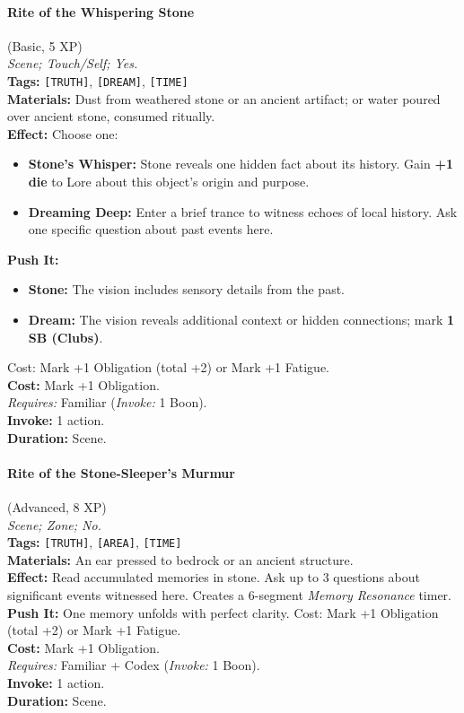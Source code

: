 \paragraph{Rite of the Whispering Stone} (Basic, 5 XP) \hfill \\
\emph{Scene; Touch/Self; Yes.} \\
\textbf{Tags:} \texttt{[TRUTH]}, \texttt{[DREAM]}, \texttt{[TIME]} \\
\textbf{Materials:} Dust from weathered stone or an ancient artifact; or water poured over ancient stone, consumed ritually. \\
\textbf{Effect:} Choose one:
\begin{itemize}
  \item \textbf{Stone's Whisper:} Stone reveals one hidden fact about its history. Gain \textbf{+1 die} to Lore about this object's origin and purpose.
  \item \textbf{Dreaming Deep:} Enter a brief trance to witness echoes of local history. Ask one specific question about past events here.
\end{itemize}
\textbf{Push It:}
\begin{itemize}
  \item \textbf{Stone:} The vision includes sensory details from the past.
  \item \textbf{Dream:} The vision reveals additional context or hidden connections; mark \textbf{1 SB (Clubs)}.
\end{itemize}
Cost: Mark +1 Obligation (total +2) or Mark +1 Fatigue. \\
\textbf{Cost:} Mark +1 Obligation. \\
\textit{Requires:} Familiar (\textit{Invoke:} 1 Boon). \\
\textbf{Invoke:} 1 action. \\
\textbf{Duration:} Scene.

\paragraph{Rite of the Stone-Sleeper's Murmur} (Advanced, 8 XP) \hfill \\
\emph{Scene; Zone; No.} \\
\textbf{Tags:} \texttt{[TRUTH]}, \texttt{[AREA]}, \texttt{[TIME]} \\
\textbf{Materials:} An ear pressed to bedrock or an ancient structure. \\
\textbf{Effect:} Read accumulated memories in stone. Ask up to 3 questions about significant events witnessed here. Creates a 6-segment \textit{Memory Resonance} timer. \\
\textbf{Push It:} One memory unfolds with perfect clarity. Cost: Mark +1 Obligation (total +2) or Mark +1 Fatigue. \\
\textbf{Cost:} Mark +1 Obligation. \\
\textit{Requires:} Familiar + Codex (\textit{Invoke:} 1 Boon). \\
\textbf{Invoke:} 1 action. \\
\textbf{Duration:} Scene.

